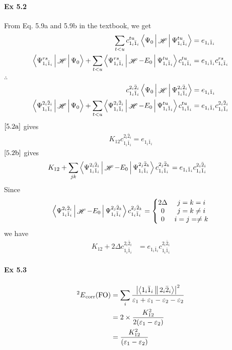 \documentclass[a4paper]{article}
\DeclareMathOperator{\sH}{\mathscr{H}}
\DeclareMathOperator{\corr}{\mathrm{corr}}
\newcommand{\ex}[1]{\paragraph{Ex #1}}
\numberwithin{equation}{subsection}
\begin{document}
\ex{5.2}
From Eq. 5.9a and 5.9b in the textbook, we get
\begin{align}
\sum_{t<u} c_{1_i\bar{1}_i}^{tu} \Braket{\Psi_0 | \sH | \Psi_{1_i\bar{1}_i}^{tu}} &= e_{1_i\bar{1}_i} \\
\Braket{\Psi_{1_i\bar{1}_i}^{rs} | \sH | \Psi_0} + \sum_{t<u} \Braket{\Psi_{1_i\bar{1}_i}^{rs} | \sH - E_0 | \Psi_{1_i\bar{1}_i}^{tu}} c_{1_i\bar{1}_i}^{tu}  &= e_{1_i\bar{1}_i} c_{1_i\bar{1}_i}^{rs} 
\end{align}
$ \therefore $
\begin{align}
c_{1_i\bar{1}_i}^{2_i\bar{2}_i} \Braket{\Psi_0 | \sH | \Psi_{1_i\bar{1}_i}^{2_i\bar{2}_i}} &= e_{1_i\bar{1}_i} \label{5.2a}\\
\Braket{\Psi_{1_i\bar{1}_i}^{2_i\bar{2}_i} | \sH | \Psi_0} + \sum_{t<u} \Braket{\Psi_{1_i\bar{1}_i}^{2_i\bar{2}_i} | \sH - E_0 | \Psi_{1_i\bar{1}_i}^{tu}} c_{1_i\bar{1}_i}^{tu}  &= e_{1_i\bar{1}_i} c_{1_i\bar{1}_i}^{2_i\bar{2}_i}   \label{5.2b}
\end{align}
$ \eqref{5.2a} $ gives
\begin{align}
K_{12} c_{1_i\bar{1}_i}^{2_i\bar{2}_i} = e_{1_i\bar{1}_i}
\end{align}
$ \eqref{5.2b} $ gives
\begin{align}
K_{12} + \sum_{jk} \Braket{\Psi_{1_i\bar{1}_i}^{2_i\bar{2}_i} | \sH - E_0 | \Psi_{1_i\bar{1}_i}^{2_j\bar{2}_k}} c_{1_i\bar{1}_i}^{2_j\bar{2}_k}  &= e_{1_i\bar{1}_i} c_{1_i\bar{1}_i}^{2_i\bar{2}_i} 
\end{align}
Since
\begin{align}
\Braket{\Psi_{1_i\bar{1}_i}^{2_i\bar{2}_i} | \sH - E_0 | \Psi_{1_i\bar{1}_i}^{2_j\bar{2}_k}} c_{1_i\bar{1}_i}^{2_j\bar{2}_k} = \left\{
\mqty{2\Delta & j=k=i\\
0 & j=k\neq i\\
0 & i=j=\neq k}
\right.
\end{align}
we have
\begin{align}
K_{12} + 2\Delta c_{1_i\bar{1}_i}^{2_i\bar{2}_i}  &= e_{1_i\bar{1}_i} c_{1_i\bar{1}_i}^{2_i\bar{2}_i} 
\end{align}

\ex{5.3}
\begin{align}
{^2 E}_{\corr}(\text{FO}) &= \sum_i \dfrac{\abs{\Braket{1_i\bar{1}_i||2_i\bar{2}_i}}^2}{\varepsilon_1 + \varepsilon_1 - \varepsilon_2 - \varepsilon_2} \notag\\
&= 2\times \dfrac{K_{12}^2}{2(\varepsilon_1 - \varepsilon_2)} \notag\\
&= \dfrac{K_{12}^2}{(\varepsilon_1 - \varepsilon_2)}
\end{align}
\end{document}
